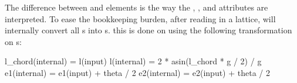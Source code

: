 The difference between  and  elements
is the way the , , and  attributes are interpreted.
To ease the bookkeeping burden, after reading in a lattice, \bmad will
internally convert all s into s. 
this is done on using the following transformation on s:
\begin{example}
  l_chord(internal) = l(input)
  l(internal) = 2 * asin(l_chord * g / 2) / g
  e1(internal) = e1(input) + theta / 2
  e2(internal) = e2(input) + theta / 2
\end{example}

\begin{figure}[tb]
  \centering
  \hspace{1cm}
  \subfigure[sbend]

\end{figure}
